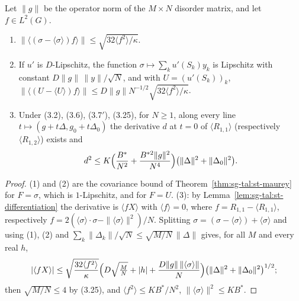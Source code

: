 \begin{lemma}\label{lem:sg-tal:st-gradient}
  \leanok
Let $\|g\|$ be the operator norm of the $M\times N$ disorder matrix, and let $f\in L^2(G)$.
\begin{enumerate}
\item $\|\langle(\sigma-\langle\sigma\rangle)f\rangle\|\le\sqrt{32\langle f^2\rangle/\kappa}$.
\item If $u'$ is $D$-Lipschitz, the function $\sigma\mapsto\sum_ku'(S_k)y_k$ is Lipschitz with constant
$D\|g\|\,\|y\|/\sqrt N$, and with $U=(u'(S_k))_k$,
$\|\langle(U-\langle U\rangle)f\rangle\|\le D\|g\|N^{-1/2}\sqrt{32\langle f^2\rangle/\kappa}$.
\item Under (3.2), (3.6), (3.7$'$), (3.25), for $N\ge1$, along every line $t\mapsto(g+t\Delta,g_0+t\Delta_0)$
the derivative $d$ at $t=0$ of $\langle R_{1,1}\rangle$ (respectively $\langle R_{1,2}\rangle$) exists and
\[
d^2\le K\Bigl(\frac{B^*}{N^2}+\frac{B^{*2}\|g\|^2}{N^4}\Bigr)\bigl(\|\Delta\|^2+\|\Delta_0\|^2\bigr).
\]
\end{enumerate}
\end{lemma}
\begin{proof}
  \leanok
(1) and (2) are the covariance bound of Theorem~\ref{thm:sg-tal:st-maurey} for $F=\sigma$, which is
$1$-Lipschitz, and for $F=U$. (3): by Lemma~\ref{lem:sg-tal:st-differentiation} the
derivative is $\langle fX\rangle$ with $\langle f\rangle=0$, where $f=R_{1,1}-\langle R_{1,1}\rangle$, respectively
$f=2(\langle\sigma\rangle\cdot\sigma-\|\langle\sigma\rangle\|^2)/N$. Splitting
$\sigma=(\sigma-\langle\sigma\rangle)+\langle\sigma\rangle$ and using (1), (2) and
$\sum_k\|\Delta_k\|/\sqrt N\le\sqrt{M/N}\,\|\Delta\|$ gives, for all $M$ and every real $h$,
\[
|\langle fX\rangle|\le\sqrt{\frac{32\langle f^2\rangle}\kappa}
\Bigl(D\sqrt{\tfrac MN}+|h|+\frac{D\|g\|\,\|\langle\sigma\rangle\|}N\Bigr)\bigl(\|\Delta\|^2+\|\Delta_0\|^2\bigr)^{1/2};
\]
then $\sqrt{M/N}\le4$ by (3.25), and $\langle f^2\rangle\le KB^*/N^2$, $\|\langle\sigma\rangle\|^2\le KB^*$.
\end{proof}

